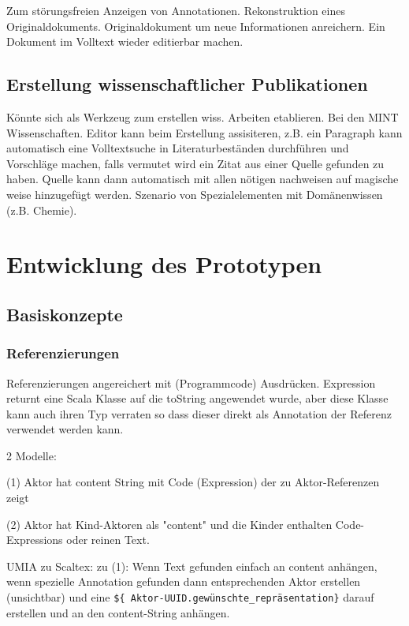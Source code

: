 Zum störungsfreien Anzeigen von Annotationen.
Rekonstruktion eines Originaldokuments.
Originaldokument um neue Informationen anreichern.
Ein Dokument im Volltext wieder editierbar machen.

\section{Erstellung wissenschaftlicher Publikationen}

Könnte sich als Werkzeug zum erstellen wiss. Arbeiten etablieren.
Bei den MINT Wissenschaften.
Editor kann beim Erstellung assisiteren, z.B. ein Paragraph kann automatisch
eine Volltextsuche in Literaturbeständen durchführen und Vorschläge machen,
falls vermutet wird ein Zitat aus einer Quelle gefunden zu haben.
Quelle kann dann automatisch mit allen nötigen nachweisen auf magische weise
hinzugefügt werden.
Szenario von Spezialelementen mit Domänenwissen (z.B. Chemie).


\chapter{Entwicklung des Prototypen}


\section{Basiskonzepte}

\subsection{Referenzierungen}

Referenzierungen angereichert mit (Programmcode) Ausdrücken.
Expression returnt eine Scala Klasse auf die toString angewendet wurde,
aber diese Klasse kann auch ihren Typ verraten so dass dieser direkt
als Annotation der Referenz verwendet werden kann.

2 Modelle:

(1) Aktor hat content String mit Code (Expression) der zu Aktor-Referenzen zeigt

(2) Aktor hat Kind-Aktoren als "content" und die Kinder enthalten Code-Expressions
    oder reinen Text.

UMIA zu Scaltex:
zu (1): Wenn Text gefunden einfach an content anhängen, wenn spezielle
Annotation gefunden dann entsprechenden Aktor erstellen (unsichtbar) und
eine \verb|${ Aktor-UUID.gewünschte_repräsentation}| darauf erstellen und an
den content-String anhängen.


